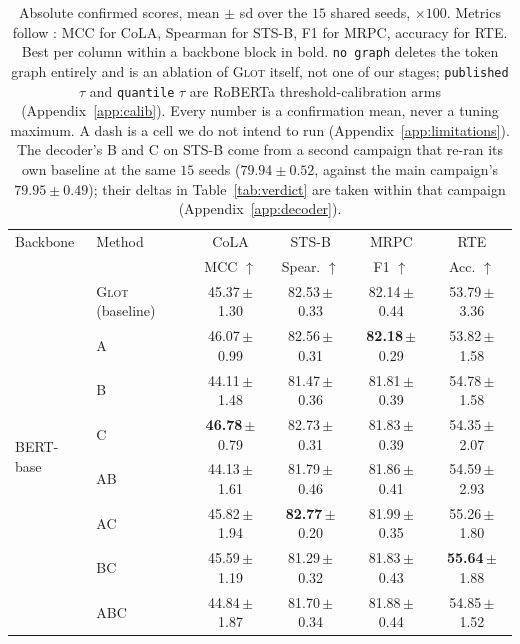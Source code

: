 \documentclass{article}
\begin{document}
\begin{table}[h]
\caption{Absolute confirmed scores, mean $\pm$ sd over the $15$ shared seeds,
$\times100$. Metrics follow \citet{mantri2026glot}: MCC for CoLA, Spearman for
STS-B, F1 for MRPC, accuracy for RTE. Best per column within a backbone block in
bold. \texttt{no graph} deletes the token graph entirely and is an ablation of
\textsc{Glot} itself, not one of our stages; \texttt{published} $\tau$ and
\texttt{quantile} $\tau$ are RoBERTa threshold-calibration arms
(Appendix~\ref{app:calib}). Every number is a confirmation mean, never a tuning
maximum. A dash is a cell we do not intend to run (Appendix~\ref{app:limitations}).
The decoder's B and C on STS-B come from a second campaign that re-ran its own
baseline at the same $15$ seeds ($79.94 \pm 0.52$, against the main campaign's
$79.95 \pm 0.49$); their deltas in Table~\ref{tab:verdict} are taken within that
campaign (Appendix~\ref{app:decoder}).}
\label{tab:absolute}
\begin{center}
\footnotesize
\setlength{\tabcolsep}{4pt}
\begin{tabular}{llcccc}
\toprule
Backbone & Method & CoLA & STS-B & MRPC & RTE \\
         &        & MCC $\uparrow$ & Spear. $\uparrow$ & F1 $\uparrow$ & Acc. $\uparrow$ \\
\midrule
\multirow{9}{*}{BERT-base}
 & \textsc{Glot} (baseline) & 45.37\,$\pm$1.30 & 82.53\,$\pm$0.33 & 82.14\,$\pm$0.44 & 53.79\,$\pm$3.36 \\
 & A                        & 46.07\,$\pm$0.99 & 82.56\,$\pm$0.31 & \textbf{82.18}\,$\pm$0.29 & 53.82\,$\pm$1.58 \\
 & B                        & 44.11\,$\pm$1.48 & 81.47\,$\pm$0.36 & 81.81\,$\pm$0.39 & 54.78\,$\pm$1.58 \\
 & C                        & \textbf{46.78}\,$\pm$0.79 & 82.73\,$\pm$0.31 & 81.83\,$\pm$0.39 & 54.35\,$\pm$2.07 \\
 & AB                       & 44.13\,$\pm$1.61 & 81.79\,$\pm$0.46 & 81.86\,$\pm$0.41 & 54.59\,$\pm$2.93 \\
 & AC                       & 45.82\,$\pm$1.94 & \textbf{82.77}\,$\pm$0.20 & 81.99\,$\pm$0.35 & 55.26\,$\pm$1.80 \\
 & BC                       & 45.59\,$\pm$1.19 & 81.29\,$\pm$0.32 & 81.83\,$\pm$0.43 & \textbf{55.64}\,$\pm$1.88 \\
 & ABC                      & 44.84\,$\pm$1.87 & 81.70\,$\pm$0.34 & 81.88\,$\pm$0.44 & 54.85\,$\pm$1.52 \\

\end{tabular}
\end{center}
\end{table}
\end{document}
